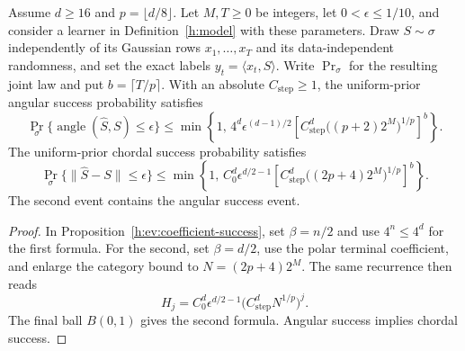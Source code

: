 \begin{corollary}
\label{h:ev:success}
Assume \(d\ge16\) and \(p=\lfloor d/8\rfloor\).
Let \(M,T\ge0\) be integers, let \(0<\epsilon\le1/10\), and consider
a learner in Definition~\ref{h:model} with these parameters.
Draw \(S\sim\sigma\) independently of its Gaussian rows
\(x_1,\ldots,x_T\) and its data-independent randomness, and set the
exact labels \(y_t=\langle x_t,S\rangle\).  Write \(\Pr_\sigma\) for
the resulting joint law and
put \(b=\lceil T/p\rceil\).  With an absolute
\(C_{\mathrm{step}}\ge1\), the uniform-prior angular success
probability satisfies
\begin{equation}\label{h:ev:half-sphere-success}
 \Pr_\sigma\{\operatorname{angle}(\widehat S,S)\le\epsilon\}
 \le
 \min\!\left\{1,\,
 4^d\epsilon^{(d-1)/2}
 \left[C_{\mathrm{step}}^d
       \bigl((p+2)2^M\bigr)^{1/p}\right]^b
 \right\}.
\end{equation}
The uniform-prior chordal success probability satisfies
\begin{equation}\label{h:ev:half-ambient-success}
 \Pr_\sigma\{\|\widehat S-S\|\le\epsilon\}
 \le
 \min\!\left\{1,\,
 C_0^d\epsilon^{d/2-1}
 \left[C_{\mathrm{step}}^d
       \bigl((2p+4)2^M\bigr)^{1/p}\right]^b
 \right\}.
\end{equation}
The second event contains the angular success event.
\end{corollary}

\begin{proof}
In Proposition~\ref{h:ev:coefficient-success}, set \(\beta=n/2\)
and use \(4^n\le4^d\) for the first formula. For the second, set
\(\beta=d/2\), use the polar terminal coefficient, and enlarge the
category bound to \(N=(2p+4)2^M\). The same recurrence then reads
\begin{equation}\label{h:ev:half-ambient-recursion}
 H_j=C_0^d\epsilon^{d/2-1}
       \bigl(C_{\mathrm{step}}^dN^{1/p}\bigr)^j.
\end{equation}
The final ball \(B(0,1)\) gives the second formula. Angular success
implies chordal success.
\end{proof}
